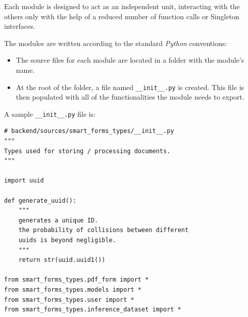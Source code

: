 \documentclass[11pt, a4paper]{report}
\def\code#1{\texttt{#1}}
\begin{document}
Each module is designed to act as an independent unit, interacting with the others only with the help of a reduced number of function calls or Singleton interfaces.

The modules are written according to the standard \textit{Python} conventions:
\begin{itemize}
    \item The source files for each module are located in a folder with the module's name.
    \item At the root of the folder, a file named \code{\_\_init\_\_.py} is created. This file is then populated with all of the functionalities the module needs to export.
\end{itemize}

A sample \code{\_\_init\_\_.py} file is:

\begin{verbatim}
# backend/sources/smart_forms_types/__init__.py
"""
Types used for storing / processing documents.
"""

import uuid

def generate_uuid():
    """
    generates a unique ID.
    the probability of collisions between different
    uuids is beyond negligible.
    """
    return str(uuid.uuid1())

from smart_forms_types.pdf_form import *
from smart_forms_types.models import *
from smart_forms_types.user import *
from smart_forms_types.inference_dataset import *
\end{verbatim}
\end{document}
